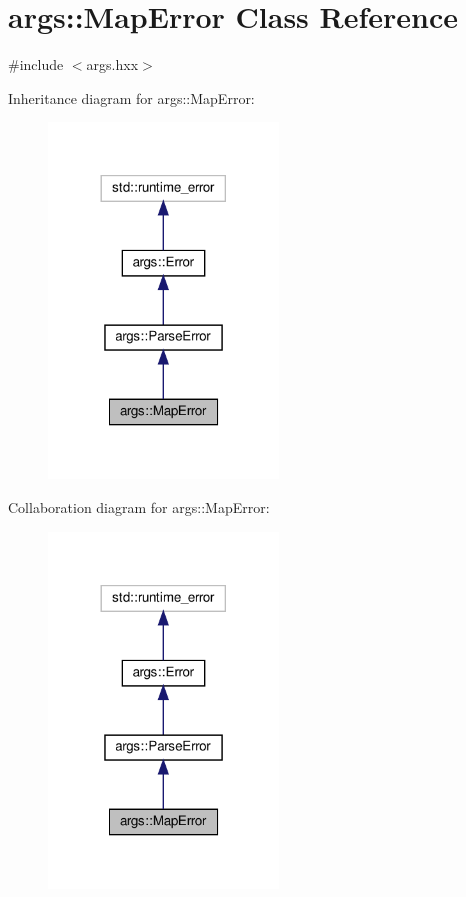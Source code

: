 \hypertarget{classargs_1_1_map_error}{}\section{args\+:\+:Map\+Error Class Reference}
\label{classargs_1_1_map_error}


{\ttfamily \#include $<$args.\+hxx$>$}



Inheritance diagram for args\+:\+:Map\+Error\+:\nopagebreak
\begin{figure}[H]
\begin{center}
\leavevmode
\includegraphics[width=173pt]{classargs_1_1_map_error__inherit__graph}
\end{center}
\end{figure}


Collaboration diagram for args\+:\+:Map\+Error\+:\nopagebreak
\begin{figure}[H]
\begin{center}
\leavevmode
\includegraphics[width=173pt]{classargs_1_1_map_error__coll__graph}
\end{center}
\end{figure}

